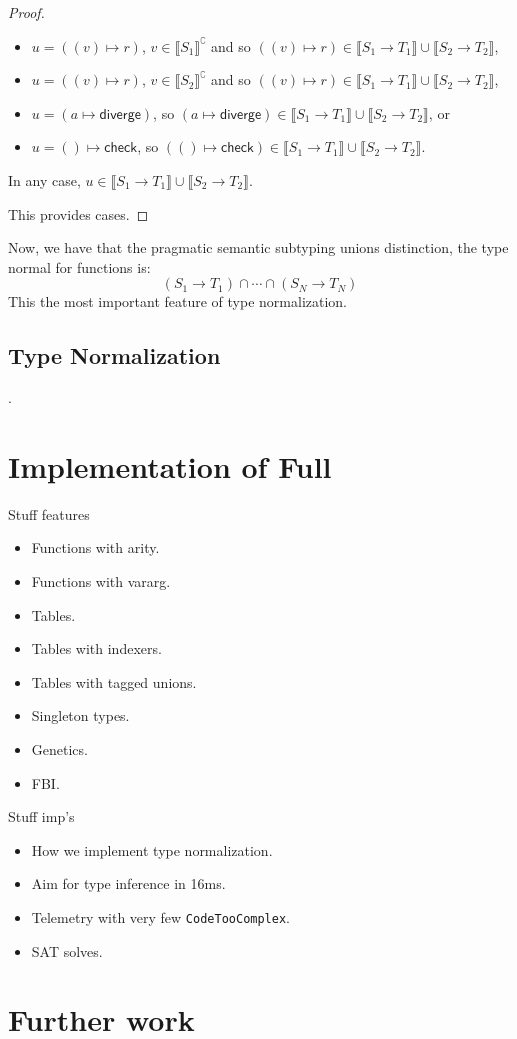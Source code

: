\documentclass[acmsmall,review,screen]{acmart}
\newcommand{\DIVERGE}{\mathsf{diverge}}
\newcommand{\CHECK}{\mathsf{check}}
\newcommand{\fun}{\mathbin{\rightarrow}}
\newcommand{\sem}[1]{\llbracket{#1}\rrbracket}
\newcommand{\nsem}[1]{\llbracket{#1}\rrbracket^\complement}
\begin{document}
\begin{proof}
\begin{enumerate}
\begin{itemize}
  \item $u = ((v) \mapsto r)$, $v \in \nsem{S_1}$
    and so $((v) \mapsto r) \in  \sem{S_1 \fun T_1} \cup \sem{S_2 \fun T_2}$,

  \item $u = ((v) \mapsto r)$, $v \in \nsem{S_2}$
    and so $((v) \mapsto r) \in \sem{S_1 \fun T_1} \cup \sem{S_2 \fun T_2}$,
    
  \item $u = (a \mapsto \DIVERGE)$, so $(a \mapsto \DIVERGE) \in \sem{S_1 \fun T_1} \cup \sem{S_2 \fun T_2}$, or
    
  \item $u = () \mapsto \CHECK$, so $(() \mapsto \CHECK) \in \sem{S_1 \fun T_1} \cup \sem{S_2 \fun T_2}$.

  \end{itemize}
  In any case, $u \in \sem{S_1 \fun T_1} \cup \sem{S_2 \fun T_2}$.

  \end{enumerate}
  This provides cases.
\end{proof}

Now, we have that the  pragmatic semantic subtyping unions distinction,
the type normal for functions is:
\[
  (S_1 \fun T_1) \cap \cdots \cap (S_N \fun T_N)  
\] 
This the most important feature of type normalization.

\subsection{Type Normalization}
\label{subsec:typnorm}.
  
\section{Implementation of Full }

Stuff features
\begin{itemize}
\item Functions with arity.
\item Functions with vararg.
\item Tables.
\item Tables with indexers.
\item Tables with tagged unions.
\item Singleton types.
\item Genetics.
\item FBI.
\end{itemize}
Stuff imp's
\begin{itemize}
\item How we implement type normalization.
\item Aim for type inference in 16ms.
\item Telemetry with very few \verb|CodeTooComplex|.
\item SAT solves.
\end{itemize}

\section{Further work}



\end{document}

